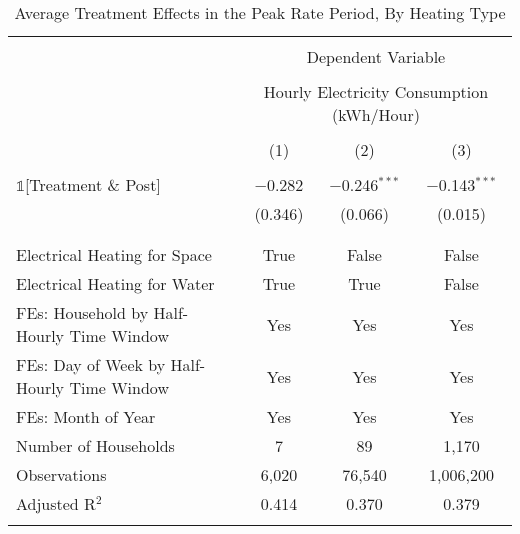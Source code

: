 
\begin{table}[!htbp] \centering 
  \caption{Average Treatment Effects in the Peak Rate Period, By Heating Type} 
  \label{Table:Average-Treatment-Effects-in-the-Peak-Rate-Period_By-Heating-Type_Model-without-Interaction-Terms} 
\small 
\begin{tabular}{@{\extracolsep{20pt}}lccc} 
\\[-1.8ex]\hline 
\hline \\[-1.8ex] 
 & \multicolumn{3}{c}{Dependent Variable} \\ 
\cline{2-4} 
\\[-1.8ex] & \multicolumn{3}{c}{Hourly Electricity Consumption  (kWh/Hour)} \\ 
\\[-1.8ex] & (1) & (2) & (3)\\ 
\hline \\[-1.8ex] 
 $\mathbb{1}$[Treatment \& Post] & $-$0.282 & $-$0.246$^{***}$ & $-$0.143$^{***}$ \\ 
  & (0.346) & (0.066) & (0.015) \\ 
  & & & \\ 
\hline \\[-1.8ex] 
Electrical Heating for Space & True & False & False \\ 
Electrical Heating for Water & True & True & False \\ 
FEs: Household by Half-Hourly Time Window & Yes & Yes & Yes \\ 
FEs: Day of Week by Half-Hourly Time Window & Yes & Yes & Yes \\ 
FEs: Month of Year & Yes & Yes & Yes \\ 
Number of Households &     7 &    89 & 1,170 \\ 
Observations & 6,020 & 76,540 & 1,006,200 \\ 
Adjusted R$^{2}$ & 0.414 & 0.370 & 0.379 \\ 
\hline 
\hline \\[-1.8ex] 
\end{tabular} 
\end{table} 
